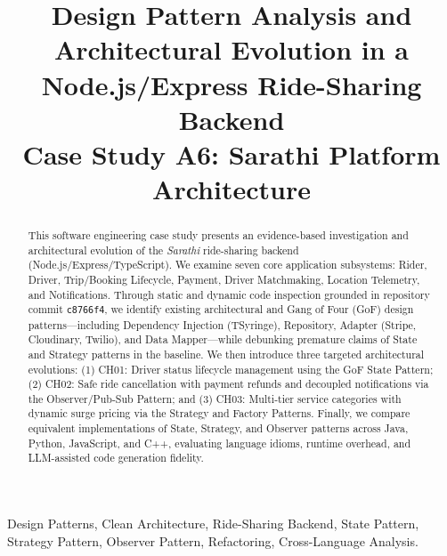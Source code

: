 \documentclass[conference]{IEEEtran}
\begin{document}
\title{Design Pattern Analysis and Architectural Evolution in a Node.js/Express Ride-Sharing Backend\\
\large Case Study A6: Sarathi Platform Architecture}

\author{
}

\maketitle

\begin{abstract}
This software engineering case study presents an evidence-based investigation and architectural evolution of the \textit{Sarathi} ride-sharing backend (Node.js/Express/TypeScript). We examine seven core application subsystems: Rider, Driver, Trip/Booking Lifecycle, Payment, Driver Matchmaking, Location Telemetry, and Notifications. Through static and dynamic code inspection grounded in repository commit \texttt{c8766f4}, we identify existing architectural and Gang of Four (GoF) design patterns—including Dependency Injection (TSyringe), Repository, Adapter (Stripe, Cloudinary, Twilio), and Data Mapper—while debunking premature claims of State and Strategy patterns in the baseline. We then introduce three targeted architectural evolutions: (1) CH01: Driver status lifecycle management using the GoF State Pattern; (2) CH02: Safe ride cancellation with payment refunds and decoupled notifications via the Observer/Pub-Sub Pattern; and (3) CH03: Multi-tier service categories with dynamic surge pricing via the Strategy and Factory Patterns. Finally, we compare equivalent implementations of State, Strategy, and Observer patterns across Java, Python, JavaScript, and C++, evaluating language idioms, runtime overhead, and LLM-assisted code generation fidelity.
\end{abstract}

\begin{IEEEkeywords}
Design Patterns, Clean Architecture, Ride-Sharing Backend, State Pattern, Strategy Pattern, Observer Pattern, Refactoring, Cross-Language Analysis.
\end{IEEEkeywords}
\end{document}
